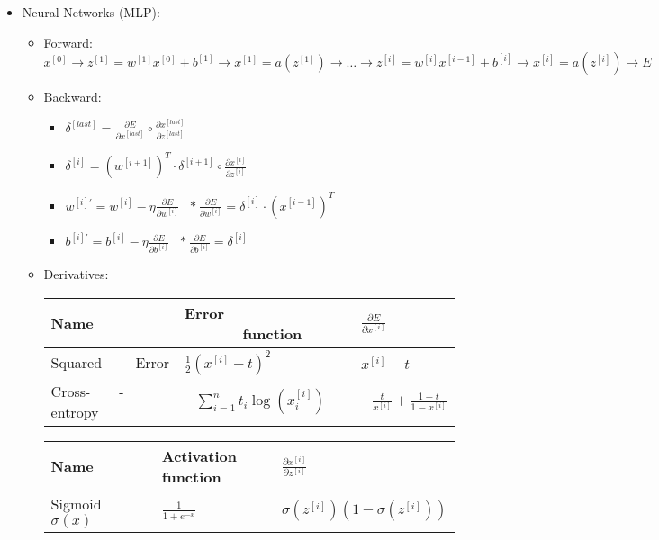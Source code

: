 \documentclass[twocolumn, 10pt]{article}
\begin{document}
\begin{itemize}[leftmargin=*, itemsep=0pt]
    \item Neural Networks (MLP):
    \begin{itemize}[topsep=0pt]
        \item Forward: $x^{[0]}\rightarrow z^{[1]}=w^{[1]}x^{[0]}+b^{[1]}\rightarrow x^{[1]}=a\left(z^{[1]}\right) \rightarrow \ldots \rightarrow z^{[i]}=w^{[i]}x^{[i-1]}+b^{[i]} \rightarrow x^{[i]}=a\left(z^{[i]}\right) \rightarrow E $
        \item Backward:
        \begin{itemize}[topsep=0pt, itemsep=3pt]
            \item $\displaystyle \delta^{[last]}=\frac{\partial E}{\partial x^{[last]}}\circ \frac{\partial x^{[last]}}{\partial z^{[last]}}$
            \item $\displaystyle \delta^{[i]}=\left(w^{[i+1]}\right)^T\cdot\delta^{[i+1]}\circ\frac{\partial x^{[i]}}{\partial z^{[i]}}$
            \item $\displaystyle w^{[i]'}=w^{[i]}-\eta\frac{\partial E}{\partial w^{[i]}}$ \;\;\;\, $*\ \displaystyle \frac{\partial E}{\partial w^{[i]}}=\delta^{[i]}\cdot \left(x^{[i-1]}\right)^T$
            \item $\displaystyle b^{[i]'}=b^{[i]}-\eta\frac{\partial E}{\partial b^{[i]}}$ \;\;\;\;\;\;\;\  $*\ \displaystyle \frac{\partial E}{\partial b^{[i]}}=\delta^{[i]}$
        \end{itemize}
        \newpage
        \item Derivatives: \\[3pt]
        {\renewcommand{\arraystretch}{1.6}
        \begin{tabular}{ | M{6em} | M{8em} | M{7em} | } \hline
            Name & Error \ \ \ \ \ \ \ function & $\displaystyle \frac{\partial E}{\partial x^{[i]}}$ \\\hline
            Squared \ \ \ \ Error & $\displaystyle \frac{1}{2}\left(x^{[i]}-t\right)^2$ & $x^{[i]}-t$ \\\hline
            Cross-\ \ \ \ -entropy & $\displaystyle -\sum_{i=1}^{n}t_{i}\log\left(x_{i}^{[i]}\right)$ & $\displaystyle -\frac{t}{x^{[i]}}+\frac{1-t}{1-x^{[i]}}$ \\\hline
        \end{tabular}}
        {\renewcommand{\arraystretch}{1.6}
        \begin{tabular}{ | M{6em} | M{6em} | M{9em} | } \hline
            Name & Activation function & $\displaystyle \frac{\partial x^{[i]}}{\partial z^{[i]}}$ \\\hline
            Sigmoid \ \ \ \ $\sigma\left(x\right)$ & $\displaystyle \frac{1}{1+e^{-x}}$ & $\sigma\left(z^{[i]}\right)\left(1-\sigma\left(z^{[i]}\right)\right)$ \\\hline

\end{tabular}}
\end{itemize}
\end{itemize}
\end{document}
